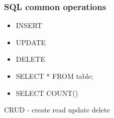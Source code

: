 \begin{frame}[fragile]
        \frametitle{SQL common operations}

\begin{itemize}
\item INSERT
\item UPDATE
\item DELETE
\item SELECT * FROM table;
\item SELECT COUNT()
\end{itemize}
CRUD - create read update delete

\end{frame}

